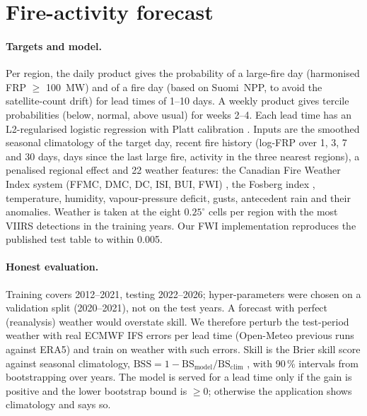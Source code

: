 \documentclass[11pt,a4paper]{article}
\begin{document}
\section{Fire-activity forecast}\label{sec:forecast}

\paragraph{Targets and model.}
Per region, the daily product gives the probability of a large-fire day (harmonised FRP
$\geq$ \SI{100}{MW}) and of a fire day (based on Suomi~NPP, to avoid the satellite-count drift) for lead
times of 1--10 days. A weekly product gives tercile probabilities (below, normal, above usual) for weeks
2--4. Each lead time has an L2-regularised logistic regression with Platt calibration \cite{platt1999}.
Inputs are the smoothed seasonal climatology of the target day, recent fire history (log-FRP over 1, 3, 7
and 30 days, days since the last large fire, activity in the three nearest regions), a penalised regional
effect and 22 weather features: the Canadian Fire Weather Index system (FFMC, DMC, DC, ISI, BUI, FWI)
\cite{vanwagner1987}, the Fosberg index \cite{fosberg1978}, temperature, humidity, vapour-pressure deficit,
gusts, antecedent rain and their anomalies. Weather is taken at the eight $0.25^\circ$ cells per region
with the most VIIRS detections in the training years. Our FWI implementation reproduces the published test
table \cite{vanwagnerpickett1985} to within 0.005.

\paragraph{Honest evaluation.}
Training covers 2012--2021, testing 2022--2026; hyper-parameters were chosen on a validation split
(2020--2021), not on the test years. A forecast with perfect (reanalysis) weather would overstate skill.
We therefore perturb the test-period weather with real ECMWF IFS errors per lead time (Open-Meteo previous
runs against ERA5) and train on weather with such errors. Skill is the Brier skill score against seasonal
climatology, $\mathrm{BSS} = 1 - \mathrm{BS}_{\mathrm{model}}/\mathrm{BS}_{\mathrm{clim}}$ \cite{brier1950},
with 90\,\% intervals from bootstrapping over years. The model is served for a lead time only if the gain
is positive and the lower bootstrap bound is $\geq 0$; otherwise the application shows climatology and
says so.
\end{document}
